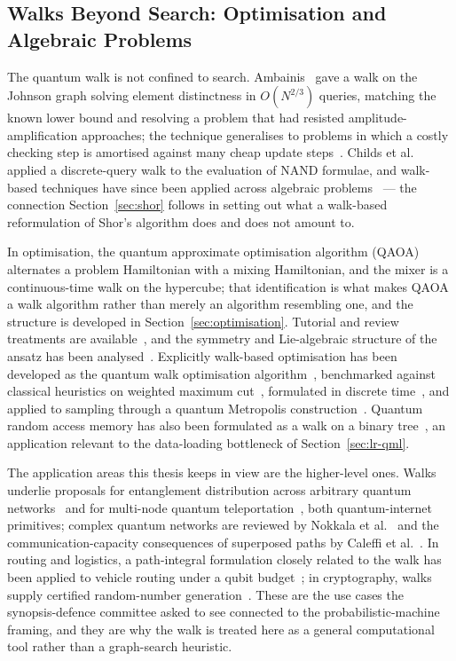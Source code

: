 \subsection{Walks Beyond Search: Optimisation and Algebraic Problems}
The quantum walk is not confined to search. Ambainis~\cite{Ambainis_2003} gave a
walk on the Johnson graph solving element distinctness in $O(N^{2/3})$ queries,
matching the known lower bound and resolving a problem that had resisted
amplitude-amplification approaches; the technique generalises to problems in
which a costly checking step is amortised against many cheap update
steps~\cite{Ambainis_2004}. Childs et al.~\cite{Childs_2007} applied a
discrete-query walk to the evaluation of NAND formulae, and walk-based
techniques have since been applied across algebraic
problems~\cite{Childs_2008} --- the connection Section~\ref{sec:shor}
follows in setting out what a walk-based reformulation of Shor's algorithm
does and does not amount to.

In optimisation, the quantum approximate optimisation algorithm
(QAOA)~\cite{Farhi_2014, Farhi_2016} alternates a problem Hamiltonian with a
mixing Hamiltonian, and the mixer is a continuous-time walk on the hypercube;
that identification is what makes QAOA a walk algorithm rather than merely an
algorithm resembling one, and the structure is developed in
Section~\ref{sec:optimisation}. Tutorial and review treatments are
available~\cite{Jaeho_2019, Chicano_2025}, and the symmetry and Lie-algebraic
structure of the ansatz has been analysed~\cite{Kazi_2025}. Explicitly
walk-based optimisation has been developed as the quantum walk optimisation
algorithm~\cite{Marsh_2020}, benchmarked against classical heuristics on
weighted maximum cut~\cite{Bennett_2025}, formulated in discrete
time~\cite{Liliopoulos_2024}, and applied to sampling through a quantum
Metropolis construction~\cite{Campos_2023}. Quantum random access memory has
also been formulated as a walk on a binary
tree~\cite{Asaka_2021, Asaka_2023, Mullor_2022}, an application relevant to the
data-loading bottleneck of Section~\ref{sec:lr-qml}.

The application areas this thesis keeps in view are the higher-level ones. Walks
underlie proposals for entanglement distribution across arbitrary quantum
networks~\cite{Chen_2024c} and for multi-node quantum
teleportation~\cite{Ikken_2025}, both quantum-internet primitives; complex
quantum networks are reviewed by Nokkala et al.~\cite{Nokkala_2024} and the
communication-capacity consequences of superposed paths by Caleffi et
al.~\cite{Caleffi_2023}. In routing and logistics, a path-integral formulation
closely related to the walk has been applied to vehicle routing under a qubit
budget~\cite{Gautam_2024}; in cryptography, walks supply certified random-number
generation~\cite{Haider_2023}. These are the use cases the synopsis-defence
committee asked to see connected to the probabilistic-machine framing, and they
are why the walk is treated here as a general computational tool rather than a
graph-search heuristic.

